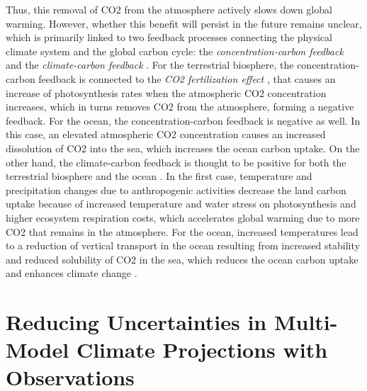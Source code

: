 Thus, this removal of \ac{CO2} from the atmosphere actively slows down global
warming. However, whether this benefit will persist in the future remains
unclear, which is primarily linked to two feedback processes connecting the
physical climate system and the global carbon cycle: the
\emph{concentration-carbon feedback} and the \emph{climate-carbon feedback}
\autocite{Friedlingstein2006, Gregory2009, Collins2013}. For the terrestrial
biosphere, the concentration-carbon feedback is connected to the \emph{\ac{CO2}
  fertilization effect} \autocite{Walker2020}, that causes an increase of
photosynthesis rates when the atmospheric \ac{CO2} concentration increases,
which in turns removes \ac{CO2} from the atmosphere, forming a negative
feedback. For the ocean, the concentration-carbon feedback is negative as well.
In this case, an elevated atmospheric \ac{CO2} concentration causes an
increased dissolution of \ac{CO2} into the sea, which increases the ocean
carbon uptake. On the other hand, the climate-carbon feedback is thought to be
positive for both the terrestrial biosphere and the ocean
\autocite{Gregory2009}. In the first case, temperature and precipitation
changes due to anthropogenic activities decrease the land carbon uptake because
of increased temperature and water stress on photosynthesis and higher
ecosystem respiration costs, which accelerates global warming due to more
\ac{CO2} that remains in the atmosphere. For the ocean, increased temperatures
lead to a reduction of vertical transport in the ocean resulting from increased
stability and reduced solubility of \ac{CO2} in the sea, which reduces the
ocean carbon uptake and enhances climate change \autocite{Gregory2009}.


\section{Reducing Uncertainties in Multi-Model Climate Projections
  with Observations}
\label{sec:02:reducing_uncertainties}

